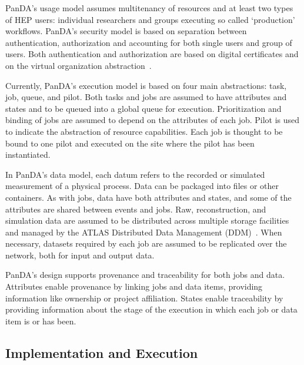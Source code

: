 PanDA's usage model assumes multitenancy of resources and at least two types of
HEP users: individual researchers and groups executing so called `production'
workflows.
PanDA's security model is based on separation between authentication,
authorization and accounting for both single users and group of users. Both
authentication and authorization are based on digital certificates and on the
virtual organization abstraction~\cite{foster2001anatomy}.

Currently, PanDA's execution model is based on four main abstractions: task,
job, queue, and pilot. Both tasks and jobs are assumed to have attributes and
states and to be queued into a global queue for execution. Prioritization and
binding of jobs are assumed to depend on the attributes of each job. Pilot is
used to indicate the abstraction of resource capabilities. Each job is thought
to be bound to one pilot and executed on the site where the pilot has been
instantiated.

In PanDA's data model, each datum refers to the recorded or simulated
measurement of a physical process. Data can be packaged into files or other
containers. As with jobs, data have both attributes and states, and some of the
attributes are shared between events and jobs. Raw, reconstruction, and
simulation data are assumed to be distributed across multiple storage facilities
and managed by the ATLAS Distributed Data Management
(DDM)~\cite{garonne2012atlas}. When necessary, datasets required by each job are
assumed to be replicated over the network, both for input and output data.

PanDA's design supports provenance and traceability for both jobs and data.
Attributes enable provenance by linking jobs and data items, providing
information like ownership or project affiliation. States enable traceability by
providing information about the stage of the execution in which each job or data
item is or has been.


\subsection{Implementation and Execution}
\label{ssec:panda_arch}

